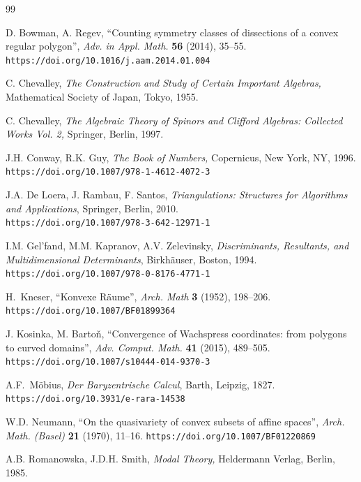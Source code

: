 \documentclass[12pt]{amsart}
\theoremstyle{plain}
\theoremstyle{definition}
\numberwithin{equation}{section}
\begin{document}
\begin{thebibliography}{99}

D. Bowman, A. Regev,
``{Counting symmetry classes of dissections of a convex regular polygon}'',
\textit{Adv. in Appl. Math.} \textbf{56} (2014), 35--55.\\
\texttt{https://doi.org/10.1016/j.aam.2014.01.004}

C. Chevalley,
\textit{The Construction and Study of Certain Important Algebras,}
Mathematical Society of Japan, Tokyo, 1955.

C. Chevalley,
\textit{The Algebraic Theory of Spinors and Clifford Algebras: Collected Works Vol. 2,}
Springer, Berlin, 1997.

J.H. Conway, R.K. Guy,
\textit{The Book of Numbers,}
Copernicus, New York, NY, 1996.\\
\texttt{https://doi.org/10.1007/978-1-4612-4072-3}

J.A. De Loera, J. Rambau, F. Santos,
\textit{Triangulations: Structures for Algorithms and
 Applications},
Springer, Berlin, 2010.\\
\texttt{https://doi.org/10.1007/978-3-642-12971-1}

I.M. Gel’fand, M.M. Kapranov, A.V. Zelevinsky, \textit{Discriminants, Resultants, and Multidimensional Determinants}, Birkh\"{a}user, Boston, 1994.\\
\texttt{https://doi.org/10.1007/978-0-8176-4771-1}

H.~Kneser, ``{Konvexe R\"{a}ume}'', \textit{Arch. Math} \textbf{3} (1952), 198--206.\\
\texttt{https://doi.org/10.1007/BF01899364}

J. Kosinka, M. Barto\v n,
``{Convergence of Wachspress coordinates: from polygons to curved domains}'',
\textit{ Adv. Comput. Math.} \textbf{41} (2015), 489--505.\\
\texttt{https://doi.org/10.1007/s10444-014-9370-3}

A.F.~M\"obius,
\textit{Der Baryzentrische Calcul},
Barth, Leipzig, 1827.
\texttt{https://doi.org/10.3931/e-rara-14538}

W.D. Neumann,
``{On the quasivariety of convex subsets of affine spaces}'',
\textit{Arch. Math. (Basel)} \textbf{21} (1970), 11--16.
\texttt{https://doi.org/10.1007/BF01220869}

A.B. Romanowska, J.D.H. Smith,
{\em Modal Theory,}
Heldermann Verlag, Berlin, 1985.


\end{thebibliography}
\end{document}
